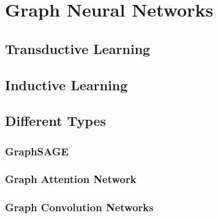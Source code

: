 
\chapter{Graph Neural Networks}
	
	\section{Transductive Learning}
	
	
	\section{Inductive Learning}
	
	
	\section{Different Types}
		\subsection{GraphSAGE}
		
		
		\subsection{Graph Attention Network}
		
		
		\subsection{Graph Convolution Networks}
	